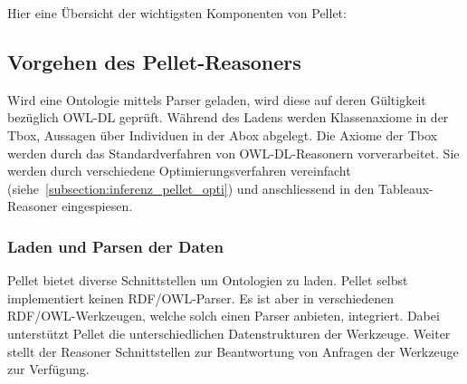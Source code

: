 Hier eine Übersicht der wichtigsten Komponenten von Pellet:
\begin{table}[H]
\centering
{}\hfill
{}
\end{table}


\subsection{Vorgehen des Pellet-Reasoners}
\label{subsection:inferenz_pellet_vorgehen}
Wird eine Ontologie mittels Parser geladen, wird diese auf deren Gültigkeit bezüglich OWL-DL geprüft. Während des Ladens werden Klassenaxiome in der Tbox, Aussagen über Individuen in der Abox abgelegt. Die Axiome der Tbox werden durch das Standardverfahren von OWL-DL-Reasonern vorverarbeitet. Sie werden durch verschiedene Optimierungsverfahren vereinfacht (siehe~\ref{subsection:inferenz_pellet_opti}) und anschliessend in den Tableaux-Reasoner eingespiesen.

\subsubsection{Laden und Parsen der Daten}
\label{ssubsection:inferenz_pellet_parsing}
Pellet bietet diverse Schnittstellen um Ontologien zu laden. Pellet selbst implementiert keinen RDF/OWL-Parser. Es ist aber in verschiedenen RDF/OWL-Werkzeugen, welche solch einen Parser anbieten, integriert. Dabei unterstützt Pellet die unterschiedlichen Datenstrukturen der Werkzeuge. Weiter stellt der Reasoner Schnittstellen zur Beantwortung von Anfragen der Werkzeuge zur Verfügung.

